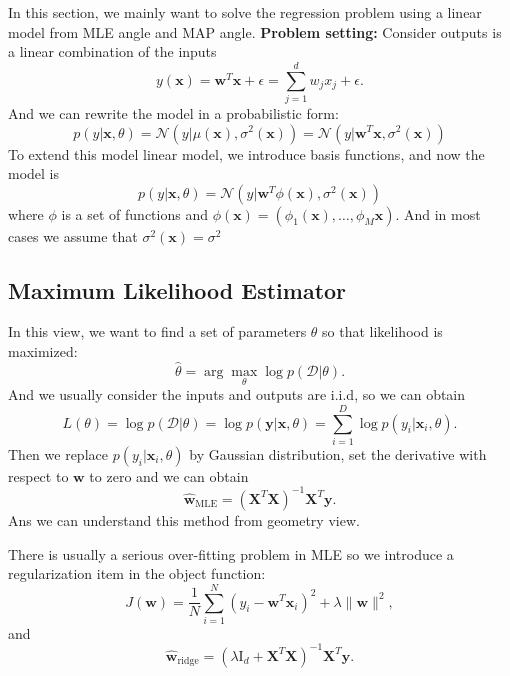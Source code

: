 \documentclass{article}
\newcommand{\norm}{\mathcal N}
\newcommand{\mbf}{\mathbf}
\newcommand{\mrm}{\mathrm}
\newcommand{\mcal}{\mathcal}
\begin{document}
In this section, we mainly want to solve the regression problem using a linear model from MLE angle and MAP angle. 
\textbf{Problem setting:} Consider outputs is a linear combination of the inputs 
\begin{equation}
    y(\mbf x) = \mbf w^T\mbf x+\epsilon = \sum_{j=1}^{d}w_jx_j+\epsilon.
\end{equation}
And we can rewrite the model in a probabilistic form:
\begin{equation}
    p(y|\mbf x, \theta) = \norm(y|\mu(\mbf x),\sigma^2(\mbf x)) = \norm(y|\mbf w^T\mbf x, \sigma^2(\mbf x))
\end{equation}
To extend this model linear model, we introduce basis functions, and now the model is 
\begin{equation}
    p(y|\mbf x,\theta) = \norm(y|\mbf w^T\phi(\mbf x),\sigma^2(\mbf x))
\end{equation}
where $\phi$ is a set of functions and $\phi(\mbf x) = (\phi_1(\mbf x), \dots, \phi_M\mbf x)$. And in most cases we assume that $\sigma^2(\mbf x) = \sigma^2$
\subsection*{Maximum Likelihood Estimator}
In this view, we want to find a set of parameters $\theta$ so that likelihood is maximized:
\begin{equation}
    \hat{\theta}=\arg\max_{\theta}\log p(\mathcal D|\theta). 
\end{equation}
And we usually consider the inputs and outputs are i.i.d, so we can obtain
\begin{equation}
    L(\theta) = \log p(\mcal D|\theta)=\log p(\mbf y|\mbf x, \theta) =\sum_{i=1}^{D}\log p(y_i|\mbf x_i,\theta).
\end{equation}
Then we replace $p(y_i|\mbf x_i, \theta)$ by Gaussian distribution, set the derivative with respect to $\mbf w$ to zero and we can obtain
\begin{equation}
    \hat{\mbf w}_{\mrm{MLE}} = (\mbf X^T\mbf X)^{-1}\mbf X^T\mbf y.
\end{equation}
Ans we can understand this method from geometry view. 

There is usually a serious over-fitting problem in MLE so we introduce a regularization item in the object function:
\begin{equation}
    J(\mbf w) = \frac{1}{N}\sum_{i=1}^{N}(y_i-\mbf w^T \mbf x_i)^2+\lambda\|\mbf w\|^2,
\end{equation}
and 
\begin{equation}
    \hat{\mbf w}_{\mrm{ridge}} = (\lambda \mrm I_d +\mbf X^T\mbf X)^{-1}\mbf X^T\mbf y.
\end{equation}
\end{document}
